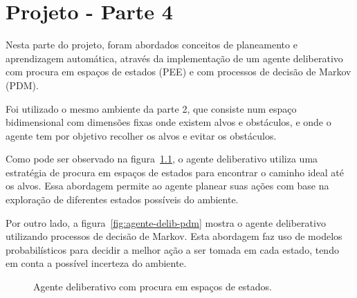 \chapter{Projeto - Parte 4}\label{ch:projeto-parte4}

Nesta parte do projeto, foram abordados conceitos de planeamento e aprendizagem automática, através da implementação de um agente deliberativo com procura em espaços de estados (PEE) e com processos de decisão de Markov (PDM).

Foi utilizado o mesmo ambiente da parte 2, que consiste num espaço bidimensional com dimensões fixas onde existem alvos e obstáculos, e onde o agente tem por objetivo recolher os alvos e evitar os obstáculos.

Como pode ser observado na figura~\ref{fig:agente-delib-pee}, o agente deliberativo utiliza uma estratégia de procura em espaços de estados para encontrar o caminho ideal até os alvos.
Essa abordagem permite ao agente planear suas ações com base na exploração de diferentes estados possíveis do ambiente.

Por outro lado, a figura~\ref{fig:agente-delib-pdm} mostra o agente deliberativo utilizando processos de decisão de Markov.
Esta abordagem faz uso de modelos probabilísticos para decidir a melhor ação a ser tomada em cada estado, tendo em conta a possível incerteza do ambiente.

\begin{figure}[H]
    \begin{center}
    \end{center}
    \caption{Agente deliberativo com procura em espaços de estados.}
    \label{fig:agente-delib-pee}
\end{figure}

